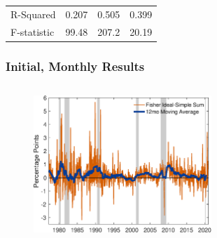 \documentclass[11pt, handout, aspectratio=169]{beamer}
\begin{document}
\begin{frame}
\begin{table}[p]
{\begin{threeparttable}
\begin{tabular}{l d{2.4} d{2.4} d{2.4}}
				R-Squared					& 0.207										& 0.505								& 0.399			 					\\
				F-statistic 				& 99.48										& 207.2								& 20.19			 					\\ \bottomrule 
			\end{tabular}
		\end{threeparttable}}
	\end{table}
	\vfill
	\hfill \hyperlink{slide:UST_Market}{}
\end{frame}

\begin{frame}
\frametitle{Initial, Monthly Results}
\label{slide:InitialResult}
\begin{columns}[b]
	\begin{column}{0.95\textwidth}
		\begin{figure}
			\centering
			\includegraphics[width=0.63\textwidth]{../Figures/GrowthDiff_v2.eps}
		\end{figure}
	\end{column}
	\begin{column}{0.05\textwidth}
		\vfill
		\hfill \hyperlink{slide:BaselineResult}{}
	\end{column}
\end{columns}
\end{frame}
\end{document}
